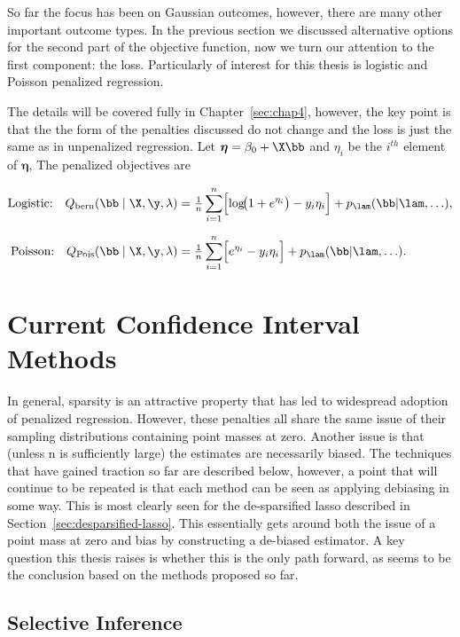 So far the focus has been on Gaussian outcomes, however, there are many other important outcome types. In the previous section we discussed alternative options for the second part of the objective function, now we turn our attention to the first component: the loss. Particularly of interest for this thesis is logistic and Poisson penalized regression.

The details will be covered fully in Chapter~\ref{sec:chap4}, however, the key point is that the the form of the penalties discussed do not change and the loss is just the same as in unpenalized regression. Let $\boldsymbol{\eta} = \beta_0 + \X \bb$ and $\eta_i$ be the $i^{th}$ element of $\boldsymbol{\eta}$, The penalized objectives are

$$
\begin{aligned}
\text{Logistic:}\quad
Q_{\text{bern}}(\bb\mid\X,\y,\lambda)
  &= \tfrac{1}{n}\sum_{i=1}^{n}
     \Bigl[
       \log\!\bigl(1+e^{\eta_i}\bigr)
       - y_i\eta_i
     \Bigr]
     + p_\lam(\bb|\lam, \ldots), \\[6pt]
\text{Poisson:}\quad
Q_{\text{Pois}}(\bb\mid\X,\y,\lambda)
  &= \tfrac{1}{n}\sum_{i=1}^{n}
     \Bigl[
       e^{\eta_i}
       - y_i\eta_i
     \Bigr]
     + p_\lam(\bb|\lam, \ldots).
\end{aligned}
$$

\section{Current Confidence Interval Methods}
\label{sec:cm}

In general, sparsity is an attractive property that has led to widespread adoption of penalized regression. However, these penalties all share the same issue of their sampling distributions containing point masses at zero. Another issue is that (unless n is sufficiently large) the estimates are necessarily biased. The techniques that have gained traction so far are described below, however, a point that will continue to be repeated is that each method can be seen as applying debiasing in some way. This is most clearly seen for the de-sparsified lasso described in Section~\ref{sec:desparsified-lasso}. This essentially gets around both the issue of a point mass at zero and bias by constructing a de-biased estimator. A key question this thesis raises is whether this is the only path forward, as seems to be the conclusion based on the methods proposed so far. 

\subsection{Selective Inference}
\label{sec:selective-inference}


